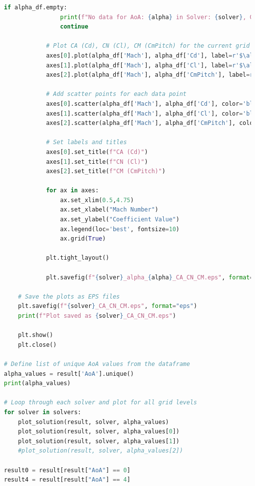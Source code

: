 \documentclass[12pt]{article}
\begin{document}
\begin{lstlisting}[language=Python, caption=Python script used to post-process numerical solutions. To report bugs email to: lorenzo.campoli@gspace.com, label=lst:pp]
            if alpha_df.empty:
                print(f"No data for AoA: {alpha} in Solver: {solver}, Grid Level: {grid_level}")
                continue
            
            # Plot CA (Cd), CN (Cl), CM (CmPitch) for the current grid level and AoA
            axes[0].plot(alpha_df['Mach'], alpha_df['Cd'], label=r'$\alpha$=' f'{alpha} - {grid_level}')
            axes[1].plot(alpha_df['Mach'], alpha_df['Cl'], label=r'$\alpha$=' f'{alpha} - {grid_level}')
            axes[2].plot(alpha_df['Mach'], alpha_df['CmPitch'], label=r'$\alpha$=' f'{alpha} - {grid_level}')
            
            # Add scatter points for each data point
            axes[0].scatter(alpha_df['Mach'], alpha_df['Cd'], color='black', marker=marker_dict[alpha])
            axes[1].scatter(alpha_df['Mach'], alpha_df['Cl'], color='black', marker=marker_dict[alpha])
            axes[2].scatter(alpha_df['Mach'], alpha_df['CmPitch'], color='black', marker=marker_dict[alpha])

            # Set labels and titles
            axes[0].set_title(f"CA (Cd)")
            axes[1].set_title(f"CN (Cl)")
            axes[2].set_title(f"CM (CmPitch)")
        
            for ax in axes:
                ax.set_xlim(0.5,4.75)
                ax.set_xlabel("Mach Number")
                ax.set_ylabel("Coefficient Value")
                ax.legend(loc='best', fontsize=10)
                ax.grid(True)

            plt.tight_layout()

            plt.savefig(f"{solver}_alpha_{alpha}_CA_CN_CM.eps", format="eps")    

    # Save the plots as EPS files
    plt.savefig(f"{solver}_CA_CN_CM.eps", format="eps")
    print(f"Plot saved as {solver}_CA_CN_CM.eps")
    
    plt.show()
    plt.close()

# Define list of unique AoA values from the dataframe
alpha_values = result['AoA'].unique()
print(alpha_values)

# Loop through each solver and plot for all grid levels
for solver in solvers:
    plot_solution(result, solver, alpha_values)
    plot_solution(result, solver, alpha_values[0])
    plot_solution(result, solver, alpha_values[1])
    #plot_solution(result, solver, alpha_values[2])

result0 = result[result["AoA"] == 0]
result4 = result[result["AoA"] == 4]


\end{lstlisting}
\end{document}
